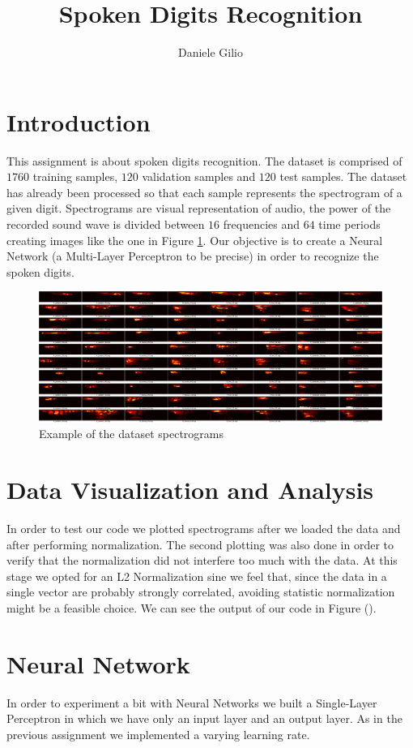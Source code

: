 \documentclass[10pt,a4paper]{report}
\author{Daniele Gilio}
\title{Spoken Digits Recognition}
\begin{document}
\maketitle
\section{Introduction}
This assignment is about spoken digits recognition. The dataset is comprised of $1760$ training samples, $120$ validation samples and $120$ test samples. The dataset has already been processed so that each sample represents the spectrogram of a given digit. Spectrograms are visual representation of audio, the power of the recorded sound wave is divided between $16$ frequencies and $64$ time periods creating images like the one in Figure \ref{fig:data_spect}. Our objective is to create a Neural Network (a Multi-Layer Perceptron to be precise) in order to recognize the spoken digits.
\begin{figure}[!ht]
\centering
\includegraphics[width=\linewidth]{spoken-digits/spectrograms.png}
\caption{Example of the dataset spectrograms}
\label{fig:data_spect}
\end{figure}
\section{Data Visualization and Analysis}
In order to test our code we plotted spectrograms after we loaded the data and after performing normalization. The second plotting was also done in order to verify that the normalization did not interfere too much with the data. At this stage we opted for an L2 Normalization sine we feel that, since the data in a single vector are probably strongly correlated, avoiding statistic normalization might be a feasible choice. We can see the output of our code in Figure ().
\section{Neural Network}
In order to experiment a bit with Neural Networks we built a Single-Layer Perceptron in which we have only an input layer and an output layer. As in the previous assignment we implemented a varying learning rate.
\end{document}
